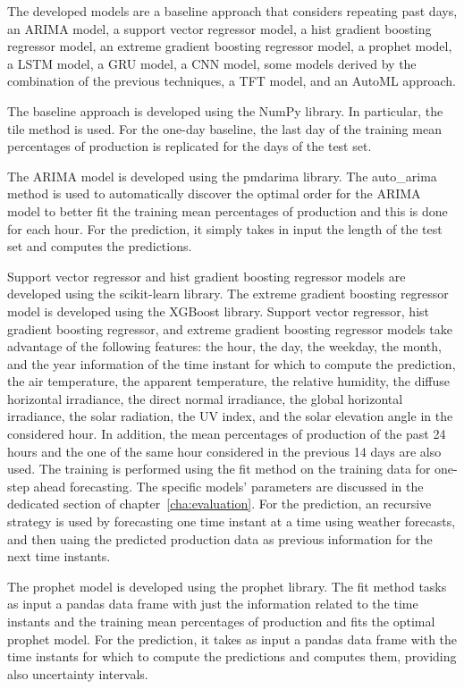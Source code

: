 The developed models are a baseline approach that considers repeating past days, an ARIMA model, a support vector regressor model, a hist gradient boosting regressor model, an extreme gradient boosting regressor model, a prophet model, a LSTM model, a GRU model, a CNN model, some models derived by the combination of the previous techniques, a TFT model, and an AutoML approach.

The baseline approach is developed using the NumPy library.
In particular, the tile method is used.
For the one-day baseline, the last day of the training mean percentages of production is replicated for the days of the test set.

The ARIMA model is developed using the pmdarima library.
The auto\_arima method is used to automatically discover the optimal order for the ARIMA model to better fit the training mean percentages of production and this is done for each hour.
For the prediction, it simply takes in input the length of the test set and computes the predictions.

Support vector regressor and hist gradient boosting regressor models are developed using the scikit-learn library.
The extreme gradient boosting regressor model is developed using the XGBoost library.
Support vector regressor, hist gradient boosting regressor, and extreme gradient boosting regressor models take advantage of the following features: the hour, the day, the weekday, the month, and the year information of the time instant for which to compute the prediction, the air temperature, the apparent temperature, the relative humidity, the diffuse horizontal irradiance, the direct normal irradiance, the global horizontal irradiance, the solar radiation, the UV index, and the solar elevation angle in the considered hour.
In addition, the mean percentages of production of the past 24 hours and the one of the same hour considered in the previous 14 days are also used.
The training is performed using the fit method on the training data for one-step ahead forecasting.
The specific models' parameters are discussed in the dedicated section of chapter~\ref{cha:evaluation}.
For the prediction, an recursive strategy is used by forecasting one time instant at a time using weather forecasts, and then uaing the predicted production data as previous information for the next time instants.

The prophet model is developed using the prophet library.
The fit method tasks as input a pandas data frame with just the information related to the time instants and the training mean percentages of production and fits the optimal prophet model.
For the prediction, it takes as input a pandas data frame with the time instants for which to compute the predictions and computes them, providing also uncertainty intervals.

